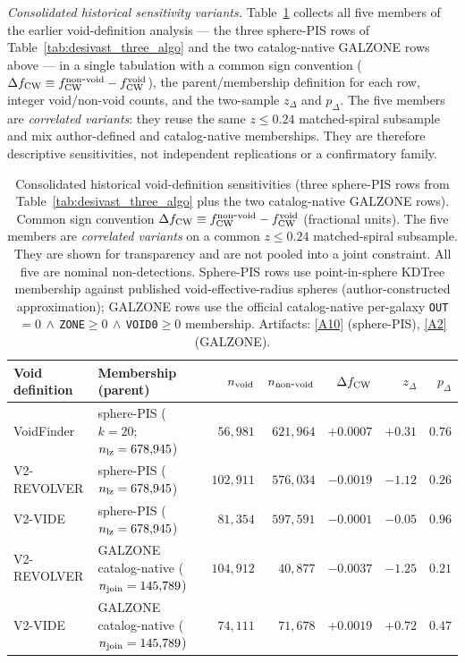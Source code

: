 \documentclass[aps,prd,twocolumn,superscriptaddress,showpacs,preprintnumbers,nofootinbib,longbibliography,floatfix]{revtex4-2}
\newcommand{\repoBase}{https://github.com/Hubify-Projects/bigbounce/blob/main}
\begin{document}
\emph{Consolidated historical sensitivity variants.}
Table~\ref{tab:bonferroni5_family} collects all five members of the
earlier void-definition analysis --- the three sphere-PIS rows of
Table~\ref{tab:desivast_three_algo} and the two catalog-native GALZONE
rows above --- in a single tabulation with a common sign convention
($\Delta f_{\rm CW} \equiv f_{\rm CW}^{\rm non\mbox{-}void} -
f_{\rm CW}^{\rm void}$), the parent/membership definition for each row,
integer void/non-void counts, and the two-sample $z_\Delta$ and
$p_\Delta$. The five members are \emph{correlated variants}: they reuse
the same $z\!\le\!0.24$ matched-spiral subsample and mix author-defined
and catalog-native memberships. They are therefore descriptive
sensitivities, not independent replications or a confirmatory family.

\begin{table}[ht]
\caption{Consolidated historical void-definition sensitivities
(three sphere-PIS rows from Table~\ref{tab:desivast_three_algo} plus the
two catalog-native GALZONE rows). Common sign convention
$\Delta f_{\rm CW} \equiv f_{\rm CW}^{\rm non\mbox{-}void} -
f_{\rm CW}^{\rm void}$ (fractional units). The five members are
\emph{correlated variants} on a common $z\!\le\!0.24$ matched-spiral
subsample. They are shown for transparency and are not pooled into a
joint constraint. All five are nominal non-detections. Sphere-PIS
rows use point-in-sphere KDTree membership against published
void-effective-radius spheres (author-constructed approximation);
GALZONE rows use the official catalog-native per-galaxy
\texttt{OUT}$=0\,\wedge\,$\texttt{ZONE}$\ge0\,\wedge\,$\texttt{VOID0}$\ge0$
membership. Artifacts:
\href{\repoBase/pipelines/p5\_desi\_chirality/outputs/17\_v0151\_closure\_recomputes.json}{[A10]}
(sphere-PIS),
\href{\repoBase/pipelines/p5\_desi\_chirality/outputs/30\_ext4\_galzone\_complement\_contrasts.json}{[A2]}
(GALZONE).}
\label{tab:bonferroni5_family}
\begin{ruledtabular}
\begin{tabular}{llrrrrr}
Void definition & Membership (parent) & $n_{\rm void}$ &
$n_{\rm non\mbox{-}void}$ & $\Delta f_{\rm CW}$ & $z_\Delta$ &
$p_\Delta$ \\
\hline
VoidFinder & sphere-PIS ($k\!=\!20$; $n_{\rm lz}=678{,}945$) & $56{,}981$ & $621{,}964$ & $+0.0007$ & $+0.31$ & $0.76$ \\
V2-REVOLVER & sphere-PIS ($n_{\rm lz}=678{,}945$) & $102{,}911$ & $576{,}034$ & $-0.0019$ & $-1.12$ & $0.26$ \\
V2-VIDE & sphere-PIS ($n_{\rm lz}=678{,}945$) & $81{,}354$ & $597{,}591$ & $-0.0001$ & $-0.05$ & $0.96$ \\
V2-REVOLVER & GALZONE catalog-native ($n_{\rm join}=145{,}789$) & $104{,}912$ & $40{,}877$ & $-0.0037$ & $-1.25$ & $0.21$ \\
V2-VIDE & GALZONE catalog-native ($n_{\rm join}=145{,}789$) & $74{,}111$ & $71{,}678$ & $+0.0019$ & $+0.72$ & $0.47$ \\
\end{tabular}
\end{ruledtabular}
\end{table}
\end{document}

